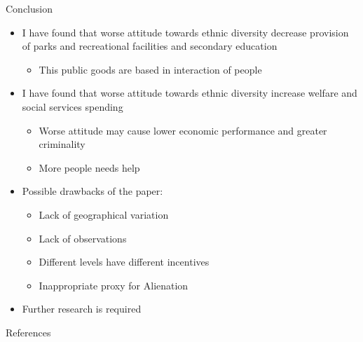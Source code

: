 \documentclass[c]{beamer}  %
\begin{document}
    \begin{frame}{Conclusion}
        \begin{itemize}
            \item I have found that worse attitude towards ethnic diversity decrease provision of parks and recreational facilities and secondary education
            \begin{itemize}
                \item This public goods are based in interaction of people
            \end{itemize}
            \pause
            \item I have found that worse attitude towards ethnic diversity increase welfare and social services spending
            \begin{itemize}
                \item Worse attitude may cause lower economic performance and greater criminality
                \item More people needs help
            \end{itemize}
            \pause
            \item Possible drawbacks of the paper:
            \begin{itemize}
                \item Lack of geographical variation
                \item Lack of observations
                \item Different levels have different incentives
                \item Inappropriate proxy for Alienation
            \end{itemize}
            \item Further research is required
        \end{itemize}
    \end{frame}
    
    
    \begin{frame}[allowframebreaks]{References}
        
        
    \end{frame}
    
\end{document}
